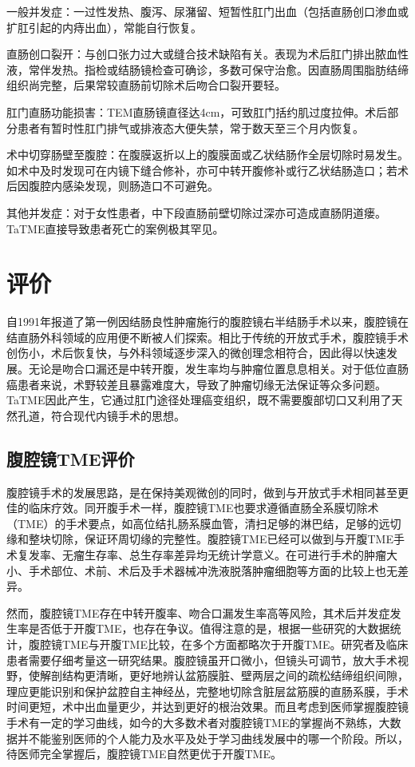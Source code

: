\documentclass[a4paper,11pt,onecolumn,twoside]{article}
\begin{document}
\begin{multicols}{2}
    \begin{compactenum}
        \item 一般并发症：一过性发热、腹泻、尿潴留、短暂性肛门出血（包括直肠创口渗血或扩肛引起的内痔出血），常能自行恢复。
        \item 直肠创口裂开：与创口张力过大或缝合技术缺陷有关。表现为术后肛门排出脓血性液，常伴发热。指检或结肠镜检查可确诊，多数可保守治愈。因直肠周围脂肪结缔组织尚完整，后果常较直肠前切除术后吻合口裂开要轻。
        \item 肛门直肠功能损害：TEM直肠镜直径达4cm，可致肛门括约肌过度拉伸。术后部分患者有暂时性肛门排气或排液态大便失禁，常于数天至三个月内恢复。
        \item 术中切穿肠壁至腹腔：在腹膜返折以上的腹膜面或乙状结肠作全层切除时易发生。如术中及时发现可在内镜下缝合修补，亦可中转开腹修补或行乙状结肠造口；若术后因腹腔内感染发现，则肠造口不可避免\supercite{14}。
        \item 其他并发症：对于女性患者，中下段直肠前壁切除过深亦可造成直肠阴道瘘。TaTME直接导致患者死亡的案例极其罕见\supercite{15}。
    \end{compactenum}

    \section{评价}
    自1991年报道了第一例因结肠良性肿瘤施行的腹腔镜右半结肠手术以来，腹腔镜在结直肠外科领域的应用便不断被人们探索。相比于传统的开放式手术，腹腔镜手术创伤小，术后恢复快，与外科领域逐步深入的微创理念相符合，因此得以快速发展。无论是吻合口漏还是中转开腹，发生率均与肿瘤位置息息相关。对于低位直肠癌患者来说，术野较差且暴露难度大，导致了肿瘤切缘无法保证等众多问题。TaTME因此产生，它通过肛门途径处理癌变组织，既不需要腹部切口又利用了天然孔道，符合现代内镜手术的思想。

    \subsection{腹腔镜TME评价}
    腹腔镜手术的发展思路，是在保持美观微创的同时，做到与开放式手术相同甚至更佳的临床疗效。同开腹手术一样，腹腔镜TME也要求遵循直肠全系膜切除术（TME）的手术要点，如高位结扎肠系膜血管，清扫足够的淋巴结，足够的远切缘和整块切除，保证环周切缘的完整性。腹腔镜TME已经可以做到与开腹TME手术复发率、无瘤生存率、总生存率差异均无统计学意义。在可进行手术的肿瘤大小、手术部位、术前、术后及手术器械冲洗液脱落肿瘤细胞等方面的比较上也无差异\supercite{16}。

    然而，腹腔镜TME存在中转开腹率、吻合口漏发生率高等风险，其术后并发症发生率是否低于开腹TME，也存在争议。值得注意的是，根据一些研究的大数据统计，腹腔镜TME与开腹TME比较，在多个方面都略次于开腹TME\supercite{17}。研究者及临床患者需要仔细考量这一研究结果。腹腔镜虽开口微小，但镜头可调节，放大手术视野，使解剖结构更清晰，更好地辨认盆筋膜脏、壁两层之间的疏松结缔组织间隙，理应更能识别和保护盆腔自主神经丛，完整地切除含脏层盆筋膜的直肠系膜，手术时间更短，术中出血量更少，并达到更好的根治效果。而且考虑到医师掌握腹腔镜手术有一定的学习曲线，如今的大多数术者对腹腔镜TME的掌握尚不熟练，大数据并不能鉴别医师的个人能力及水平及处于学习曲线发展中的哪一个阶段。所以，待医师完全掌握后，腹腔镜TME自然更优于开腹TME。


\end{multicols}
\end{document}
